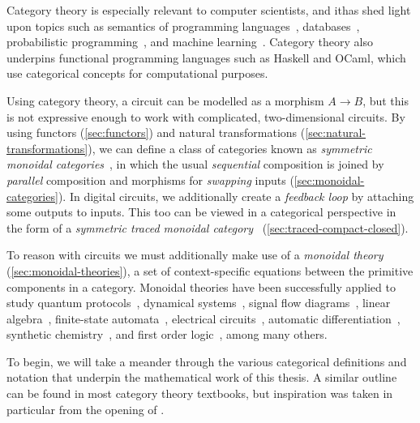 Category theory is especially relevant to computer scientists, and ithas shed
light upon topics such as semantics of programming
languages~\cite{oles1982categorytheoretic}, databases~\cite{spivak2012functorial},
probabilistic programming~\cite{cho2019disintegration,fritz2020synthetic}, and
machine learning~\cite{fong2019backprop,cockett2020reverse}.
Category theory also underpins functional programming languages such as
Haskell and OCaml, which use categorical concepts for computational purposes.

Using category theory, a circuit can be modelled as a morphism \(A \to B\), but
this is not expressive enough to work with complicated, two-dimensional
circuits.
By using functors (\cref{sec:functors}) and natural transformations
(\cref{sec:natural-transformations}), we can define a class of categories known
as \emph{symmetric monoidal categories}~\cite{maclane1963natural}, in which the
usual \emph{sequential} composition is joined by \emph{parallel} composition
and morphisms for \emph{swapping} inputs (\cref{sec:monoidal-categories}).
In digital circuits, we additionally create a
\emph{feedback loop} by attaching some outputs to inputs.
This too can be viewed in a categorical perspective in the form of a
\emph{symmetric traced monoidal category}~\cite{joyal1996traced}
(\cref{sec:traced-compact-closed}).

To reason with circuits we must additionally make use of a
\emph{monoidal theory}
(\cref{sec:monoidal-theories}), a set of context-specific equations between
the primitive components in a category.
Monoidal theories have been successfully applied to study quantum
protocols~\cite{coecke2008interacting}, dynamical
systems~\cite{baez2015categories,fong2016categorical}, signal flow
diagrams~\cite{bonchi2014categorical,bonchi2015full,bonchi2017refinement,bonchi2021survey},
linear algebra~\cite{bonchi2017interacting,zanasi2015interacting,bonchi2019graphical,boisseau2022graphical},
finite-state automata~\cite{piedeleu2021string,piedeleu2022finite}, electrical
circuits~\cite{boisseau2022string}, automatic
differentiation~\cite{alvarez-picallo2023functorial}, synthetic
chemistry~\cite{gale2023categorical}, and first order
logic~\cite{bonchi2024diagrammatic}, among many others.

To begin, we will take a meander through the various categorical definitions and
notation that underpin the mathematical work of this thesis.
A similar outline can be found in most category theory textbooks, but
inspiration was taken in particular from the opening of
\cite{ghica2023string}.








